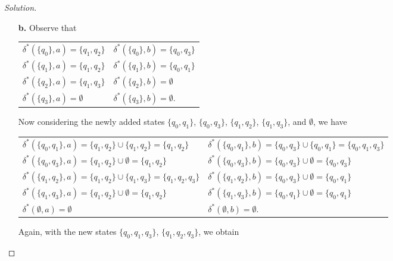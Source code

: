 \documentclass[ 12pt ]{article}
\begin{document}
\begin{enumerate}
\begin{proof}[Solution]
\begin{enumerate}
				\item[\textbf{b.}] Observe that
					\begin{center}
					\begin{tabularx}{0.5\textwidth}{
						>{\raggedright\arraybackslash}X
						>{\raggedright\arraybackslash}X }
						$\delta^* \left( \{ q_0 \}, a \right) = \{ q_1, q_2 \}$ & $\delta^* \left( \{ q_0 \}, b \right) = \{ q_0, q_3 \}$ \\
						$\delta^* \left( \{ q_1 \}, a \right) = \{ q_1, q_2 \}$ & $\delta^* \left( \{ q_1 \}, b \right) = \{ q_0, q_1 \}$ \\
						$\delta^* \left( \{ q_2 \}, a \right) = \{ q_1, q_3 \}$ & $\delta^* \left( \{ q_2 \}, b \right) = \emptyset$ \\
						$\delta^* \left( \{ q_3 \}, a \right) = \emptyset$ & $\delta^* \left( \{ q_3 \}, b \right) = \emptyset$.
					\end{tabularx}
					\end{center}
					Now considering the newly added states $\{ q_0, q_1 \}$, $\{ q_0, q_3 \}$, $\{ q_1, q_2 \}$, $\{ q_1, q_3 \}$, and $\emptyset$, we have
					\begin{center}
					\begin{tabularx}{1\textwidth}{
						>{\raggedright\arraybackslash}X
						>{\raggedright\arraybackslash}X }
						$\delta^* \left( \{ q_0, q_1 \}, a \right) = \{ q_1, q_2 \} \cup \{ q_1, q_2 \} = \{ q_1, q_2 \}$ & $\delta^* \left( \{ q_0, q_1 \}, b \right) = \{ q_0, q_3 \} \cup \{ q_0, q_1 \} = \{ q_0, q_1, q_3 \}$ \\
						$\delta^* \left( \{ q_0, q_3 \}, a \right) = \{ q_1, q_2 \} \cup \emptyset = \{ q_1, q_2 \}$ & $\delta^* \left( \{ q_0, q_3 \}, b \right) = \{ q_0, q_3 \} \cup \emptyset = \{ q_0, q_3 \}$ \\
						$\delta^* \left( \{ q_1, q_2 \}, a \right) = \{ q_1, q_2 \} \cup \{ q_1, q_3 \} = \{ q_1, q_2, q_3 \}$ & $\delta^* \left( \{ q_1, q_2 \}, b \right) = \{ q_0, q_3 \} \cup \emptyset = \{ q_0, q_1 \}$ \\
						$\delta^* \left( \{ q_1, q_3 \}, a \right) = \{ q_1, q_2 \} \cup \emptyset = \{ q_1, q_2 \}$ & $\delta^* \left( \{ q_1, q_3 \}, b \right) = \{ q_0, q_1 \} \cup \emptyset = \{ q_0, q_1 \}$ \\
						$\delta^* \left( \emptyset, a \right) = \emptyset$ & $\delta^* \left( \emptyset, b \right) = \emptyset$.
					\end{tabularx}
					\end{center}
					Again, with the new states $\{ q_0, q_1, q_3 \}$, $\{ q_1, q_2, q_3 \}$, we obtain

\end{enumerate}
\end{proof}
\end{enumerate}
\end{document}
